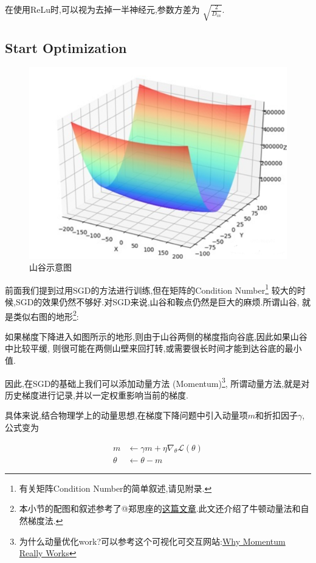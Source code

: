 在使用ReLu时,可以视为去掉一半神经元,参数方差为 $\sqrt{\frac{2}{D_{in}}}$.

\subsection{Start Optimization}

\begin{figure}[htbp]
	\centering
	\includegraphics[scale=0.55]{figures/valley.png}
	\caption{山谷示意图}
	\label{valley}
\end{figure}

前面我们提到过用SGD的方法进行训练,但在矩阵的Condition Number\footnote{有关矩阵Condition Number的简单叙述,请见附录.}
较大的时候,SGD的效果仍然不够好.对SGD来说,山谷和鞍点仍然是巨大的麻烦.所谓山谷,
就是类似右图的地形\footnote{本小节的配图和叙述参考了@郑思座的\href{https://zhuanlan.zhihu.com/p/60088231}{这篇文章}.此文还介绍了牛顿动量法和自然梯度法.}:

如果梯度下降进入如图所示的地形,则由于山谷两侧的梯度指向谷底,因此如果山谷中比较平缓,
则很可能在两侧山壁来回打转,或需要很长时间才能到达谷底的最小值.

因此,在SGD的基础上我们可以添加动量方法 (Momentum)\footnote{为什么动量优化work?可以参考这个可视化可交互网站:\href{http://distill.pub/2017/momentum}{Why Momentum Really Works}},
所谓动量方法,就是对历史梯度进行记录,并以一定权重影响当前的梯度.

具体来说,结合物理学上的动量思想,在梯度下降问题中引入动量项$m$和折扣因子$\gamma$,公式变为 

\begin{equation}
	\begin{aligned}
		m &\leftarrow \gamma m+\eta \nabla_{\theta} \mathcal L(\theta)
		\\
		\theta &\leftarrow \theta-m
	\end{aligned}
\end{equation}

